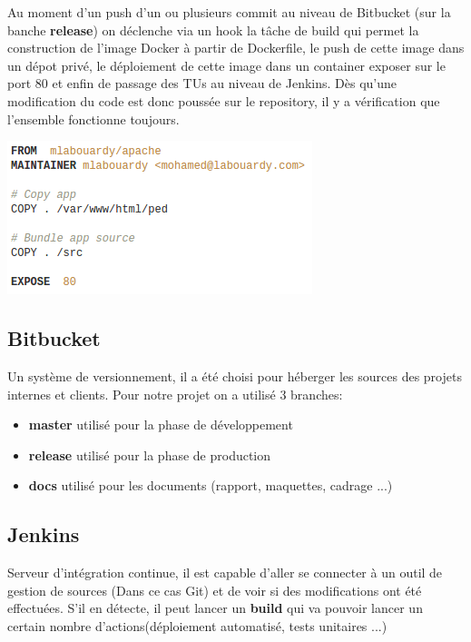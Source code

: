 \documentclass [a4paper,11pt]{article}
\begin{document}
Au moment d’un push d’un ou plusieurs commit au niveau de Bitbucket (sur la banche \textbf{release}) on déclenche via un hook la tâche de build qui permet la construction de l'image Docker à partir de Dockerfile, le push de cette image dans un dépot privé, le déploiement de cette image dans un container exposer sur le port 80 et enfin de passage des TUs au niveau de Jenkins. Dès qu’une modification du code est donc poussée sur le repository, il y a vérification que l’ensemble fonctionne toujours.

\begin{center}
\includegraphics[scale=0.7]{img/Dockerfile.png}
\end{center}

\subsection{Bitbucket}

Un système de versionnement, il a été choisi pour héberger les sources des projets internes et clients. Pour notre projet on a utilisé 3 branches:\newline

\begin{itemize}
 \item \textbf{master} utilisé pour la phase de développement
 \item \textbf{release} utilisé pour la phase de production
 \item \textbf{docs} utilisé pour les documents (rapport, maquettes, cadrage ...)
\end{itemize}

\subsection{Jenkins}

Serveur d'intégration continue, il est capable d’aller se connecter à un outil de gestion de sources (Dans ce cas Git) et de voir si des modifications ont été effectuées. S’il en détecte, il peut lancer un \textbf{build} qui va pouvoir lancer un certain nombre d’actions(déploiement automatisé, tests unitaires ...)
\end{document}
